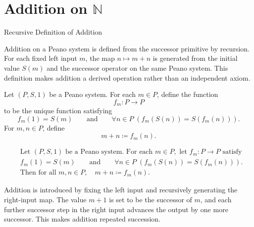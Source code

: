 \section{Addition on \texorpdfstring{$\mathbb{N}$}{N}}

\begin{topicbox}{Recursive Definition of Addition}
\begin{exposition}
Addition on a Peano system is defined from the successor primitive by
recursion. For each fixed left input $m$, the map $n \mapsto m+n$ is generated
from the initial value $S(m)$ and the successor operator on the same Peano
system. This definition makes addition a derived operation rather than an
independent axiom.
\end{exposition}

\begin{tcolorbox}[colback=defbox, colframe=defborder, arc=2pt,
  left=6pt, right=6pt, top=4pt, bottom=4pt,
  title={\small\textbf{Definition (Addition on a Peano System)}},
  fonttitle=\small\bfseries]
\begin{definition}
\label{def:addition-on-peano-system}
Let $(P,S,1)$ be a Peano system. For each $m \in P$, define the function
\[
f_m : P \to P
\]
to be the unique function satisfying
\[
f_m(1)=S(m)
\qquad\text{and}\qquad
\forall n \in P\;(f_m(S(n))=S(f_m(n))).
\]
For $m,n \in P$, define
\[
m+n \coloneqq f_m(n).
\]
\end{definition}
\end{tcolorbox}

\begin{remark*}
\[
\begin{aligned}
&\text{Let } (P,S,1) \text{ be a Peano system. For each } m \in P,
\text{ let } f_m : P \to P \text{ satisfy}\\
&f_m(1)=S(m)
\qquad\text{and}\qquad
\forall n \in P\;(f_m(S(n))=S(f_m(n))).\\
&\text{Then for all } m,n \in P,\quad m+n \coloneqq f_m(n).
\end{aligned}
\]
\end{remark*}

\begin{remark*}[Interpretation]
Addition is introduced by fixing the left input and recursively generating the
right-input map. The value $m+1$ is set to be the successor of $m$, and each
further successor step in the right input advances the output by one more
successor. This makes addition repeated succession.
\end{remark*}


\end{topicbox}
